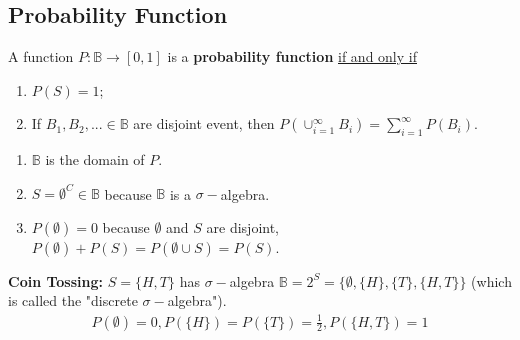 \documentclass[11pt]{elegantbook}
\begin{document}
\subsection{Probability Function}
\begin{definition}
    \normalfont
    A function $P: \mathbb{B} \rightarrow [0,1]$ is a \textbf{probability function} \underline{if and only if}
    \begin{enumerate}
        \item $P(S)=1$;
        \item If $B_1,B_2,...\in \mathbb{B}$ are disjoint event, then $P(\cup_{i=1}^\infty B_i)=\sum_{i=1}^\infty P(B_i)$.
    \end{enumerate}
\end{definition}
\begin{note}
    \begin{enumerate}
        \item $\mathbb{B}$ is the domain of $P$.
        \item $S=\emptyset^C\in \mathbb{B}$ because $\mathbb{B}$ is a $\sigma-$algebra.
        \item $P(\emptyset)=0$ because $\emptyset$ and $S$ are disjoint, $P(\emptyset)+P(S)=P(\emptyset\cup S)=P(S)$.
    \end{enumerate}
\end{note}
\begin{example}
    \textbf{Coin Tossing:} $S=\{H,T\}$ has $\sigma-$algebra $\mathbb{B}=2^S=\{\emptyset,\{H\},\{T\},\{H,T\}\}$ (which is called the "discrete $\sigma-$algebra").
    \begin{equation}
        \begin{aligned}
            P(\emptyset)=0,P(\{H\})=P(\{T\})=\frac{1}{2},P(\{H,T\})=1
        \end{aligned}
        \nonumber
    \end{equation}
\end{example}
\end{document}
